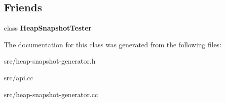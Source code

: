\subsection*{Friends}
\begin{DoxyCompactItemize}
\item 
\hypertarget{classv8_1_1internal_1_1_heap_snapshot_ab29592496458bcf1caa1bcb01dadb9c0}{}class {\bfseries Heap\+Snapshot\+Tester}\label{classv8_1_1internal_1_1_heap_snapshot_ab29592496458bcf1caa1bcb01dadb9c0}

\end{DoxyCompactItemize}


The documentation for this class was generated from the following files\+:\begin{DoxyCompactItemize}
\item 
src/heap-\/snapshot-\/generator.\+h\item 
src/api.\+cc\item 
src/heap-\/snapshot-\/generator.\+cc\end{DoxyCompactItemize}
